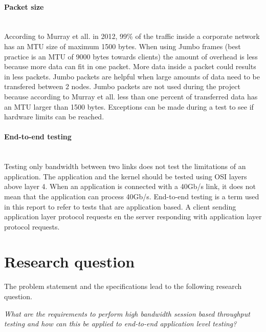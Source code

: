 \paragraph{Packet size}\label{par:packetsize}\mbox{}\\
According to Murray et all. \cite{murray2012state}  in 2012, 99\% of the traffic inside a corporate network has an MTU size of maximum 1500 bytes. 
When using Jumbo frames\cite{alliance_2017} (best practice is an MTU of 9000 bytes towards clients\cite{jet}) the amount of overhead is less because more data can fit in one packet. 
More data inside a packet could results in less packets. 
Jumbo packets are helpful when large amounts of data need to be transfered between 2 nodes.  
Jumbo packets are not used during the project because according to Murray et all. less than one percent of transferred data has an MTU larger than 1500 bytes. 
Exceptions can be made during a test to see if hardware limits can be reached.

\paragraph{End-to-end testing}\label{par:endtoend}\mbox{}\\
Testing only bandwidth between two links does not test the limitations of an application. The application and the kernel should be tested using OSI layers above layer 4. 
When an application is connected with a 40Gb/s link, it does not mean that the application can process 40Gb/s. 
End-to-end testing is a term used in this report to refer to tests that are application based.
A client sending application layer protocol requests en the server responding with application layer protocol requests.  

\section{Research question}\label{sec:researchquestion}
The problem statement and the specifications lead to the following research question.

\begin{center}
\textit{What are the requirements to perform high bandwidth session based throughput testing and how can this be applied to end-to-end application level testing?} \\
\end{center}

